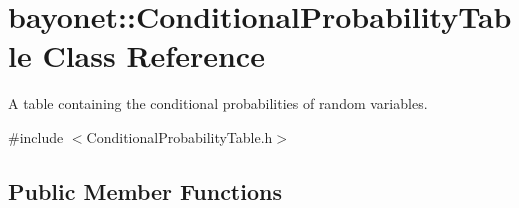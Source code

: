 \hypertarget{classbayonet_1_1_conditional_probability_table}{\section{bayonet\-:\-:Conditional\-Probability\-Table Class Reference}
\label{classbayonet_1_1_conditional_probability_table}
}


A table containing the conditional probabilities of random variables.  




{\ttfamily \#include $<$Conditional\-Probability\-Table.\-h$>$}

\subsection*{Public Member Functions}
